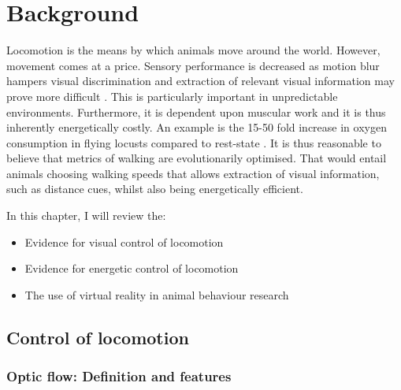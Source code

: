 \chapter{Background}
\label{chap:intro}
\vspace{4cm}
Locomotion is the means by which animals move around the world. However, movement comes at a price. Sensory performance is decreased as motion blur hampers visual discrimination \autocites{Kramer2001, Land1999} and extraction of relevant visual information may prove more difficult \autocite{Land1999}. This is particularly important in unpredictable environments. Furthermore, it is dependent upon muscular work and it is thus inherently energetically costly. An example is the 15-50 fold increase in oxygen consumption in flying locusts compared to rest-state \autocite{Krogh1949TheFlight}.
It is thus reasonable to believe that metrics of walking are evolutionarily optimised. That would entail animals choosing walking speeds that allows extraction of visual information, such as distance cues, whilst also being energetically efficient. \\
\vspace{1cm}



In this chapter, I will review the:
\begin{itemize}[noitemsep]
    \item Evidence for visual control of locomotion
    \item Evidence for energetic control of locomotion
    \item The use of virtual reality in animal behaviour research
\end{itemize}

\vfill
\clearpage
\section{Control of locomotion}

\subsection{Optic flow: Definition and features}

